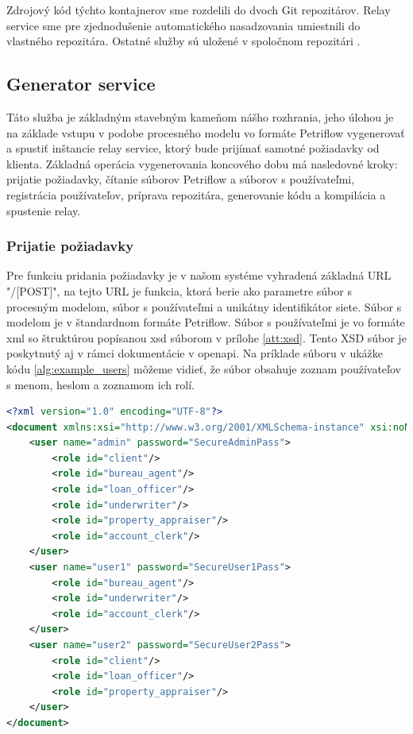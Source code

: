Zdrojový kód týchto kontajnerov sme rozdelili do dvoch Git repozitárov. Relay service sme pre zjednodušenie automatického nasadzovania umiestnili do vlastného repozitára\cite{dp_relay}. Ostatné služby sú uložené v spoločnom repozitári \cite{dp_repo}. 



\subsection{Generator service}
Táto služba je základným stavebným kameňom nášho rozhrania, jeho úlohou je na základe vstupu v podobe procesného modelu vo formáte Petriflow vygenerovať a spustiť inštancie relay service, ktorý bude prijímať samotné požiadavky od klienta. Základná operácia vygenerovania koncového dobu má nasledovné kroky:
prijatie požiadavky,
čítanie súborov Petriflow a súborov s používateľmi,
registrácia používateľov,
príprava repozitára,
generovanie kódu
a kompilácia a spustenie relay.

\subsubsection{Prijatie požiadavky}
Pre funkciu pridania požiadavky je v našom systéme vyhradená základná URL "/[POST]", na tejto URL je funkcia, ktorá berie ako parametre súbor s procesným modelom, súbor s používateľmi a unikátny identifikátor siete. Súbor s modelom je v štandardnom formáte Petriflow. Súbor s používateľmi je vo formáte \acrshort{xml} so štruktúrou popísanou \acrshort{xsd} súborom v prílohe \ref{att:xsd}. Tento XSD súbor je poskytnutý aj v rámci dokumentácie v \acrshort{openapi}. Na príklade súboru v ukážke kódu \ref{alg:example_users} môžeme vidieť, že súbor obsahuje zoznam používateľov s menom, heslom a zoznamom ich rolí.

\begin{lstlisting}[float, caption={Príklad súboru s používateľmi},label={alg:example_users},language=XML]
<?xml version="1.0" encoding="UTF-8"?>
<document xmlns:xsi="http://www.w3.org/2001/XMLSchema-instance" xsi:noNamespaceSchemaLocation="./users_schema.xsd">
	<user name="admin" password="SecureAdminPass">
		<role id="client"/>
		<role id="bureau_agent"/>
		<role id="loan_officer"/>
		<role id="underwriter"/>
		<role id="property_appraiser"/>
		<role id="account_clerk"/>
	</user>
	<user name="user1" password="SecureUser1Pass">
		<role id="bureau_agent"/>
		<role id="underwriter"/>
		<role id="account_clerk"/>
	</user>
	<user name="user2" password="SecureUser2Pass">
		<role id="client"/>
		<role id="loan_officer"/>
		<role id="property_appraiser"/>
	</user>
</document>
\end{lstlisting}

